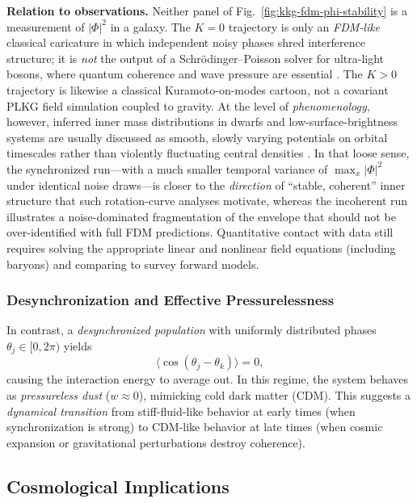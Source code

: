 \textbf{Relation to observations.}
Neither panel of Fig.~\ref{fig:kkg-fdm-phi-stability} is a measurement of $|\Phi|^2$ in a galaxy.
The $K=0$ trajectory is only an \emph{FDM-like} classical caricature in which independent noisy phases shred interference structure; it is \emph{not} the output of a Schr\"odinger--Poisson solver for ultra-light bosons, where quantum coherence and wave pressure are essential \cite{Hu2000,Marsh2016}.
The $K>0$ trajectory is likewise a classical Kuramoto-on-modes cartoon, not a covariant PLKG field simulation coupled to gravity.
At the level of \emph{phenomenology}, however, inferred inner mass distributions in dwarfs and low-surface-brightness systems are usually discussed as smooth, slowly varying potentials on orbital timescales rather than violently fluctuating central densities \cite{Bullock2017}.
In that loose sense, the synchronized run---with a much smaller temporal variance of $\max_x|\Phi|^2$ under identical noise draws---is closer to the \emph{direction} of ``stable, coherent'' inner structure that such rotation-curve analyses motivate, whereas the incoherent run illustrates a noise-dominated fragmentation of the envelope that should not be over-identified with full FDM predictions.
Quantitative contact with data still requires solving the appropriate linear and nonlinear field equations (including baryons) and comparing to survey forward models.

\subsubsection{Desynchronization and Effective Pressurelessness}
\label{subsubsec:desync}
In contrast, a \emph{desynchronized population} with uniformly distributed phases $\theta_j \in [0, 2\pi)$ yields
\begin{equation}
\langle \cos(\theta_j - \theta_k) \rangle = 0,
\end{equation}
causing the interaction energy to average out. In this regime, the system behaves as \emph{pressureless dust} ($w \approx 0$), mimicking cold dark matter (CDM). This suggests a \emph{dynamical transition} from stiff-fluid-like behavior at early times (when synchronization is strong) to CDM-like behavior at late times (when cosmic expansion or gravitational perturbations destroy coherence).

\subsection{Cosmological Implications}
\label{subsec:cosmo_implications}


